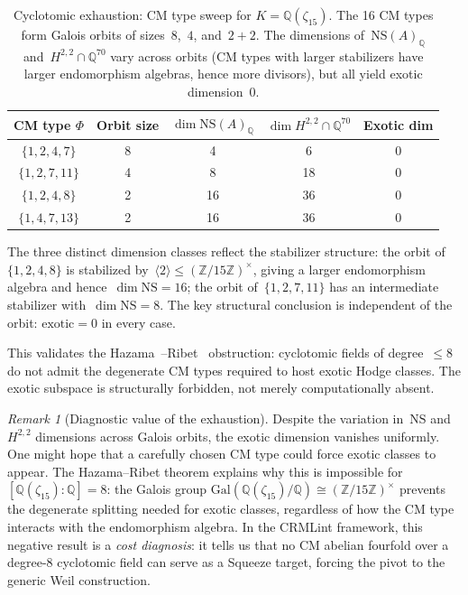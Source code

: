 \documentclass[11pt]{article}
\theoremstyle{plain}
\theoremstyle{definition}
\theoremstyle{remark}
\newtheorem{remark}[theorem]{Remark}
\newcommand{\Z}{\mathbb{Z}}
\newcommand{\Q}{\mathbb{Q}}
\newcommand{\Gal}{\mathrm{Gal}}
\newcommand{\NS}{\mathrm{NS}}
\begin{document}
\begin{table}[ht]
\centering
\caption{Cyclotomic exhaustion: CM type sweep for $K = \Q(\zeta_{15})$.
The 16 CM types form Galois orbits of sizes~$8$,~$4$, and~$2+2$.
The dimensions of~$\NS(A)_\Q$ and~$H^{2,2}\cap\Q^{70}$ vary across
orbits (CM types with larger stabilizers have larger endomorphism
algebras, hence more divisors), but all yield exotic dimension~0.}
\label{tab:cm-sweep}
\begin{tabular}{ccccc}
\toprule
\textbf{CM type $\Phi$} & \textbf{Orbit size} & $\dim \NS(A)_\Q$
& $\dim H^{2,2}\cap\Q^{70}$ & \textbf{Exotic dim} \\
\midrule
$\{1,2,4,7\}$   & 8 & 4  & 6  & 0 \\
$\{1,2,7,11\}$  & 4 & 8  & 18 & 0 \\
$\{1,2,4,8\}$   & 2 & 16 & 36 & 0 \\
$\{1,4,7,13\}$  & 2 & 16 & 36 & 0 \\
\bottomrule
\end{tabular}
\end{table}

\noindent The three distinct dimension classes reflect the stabilizer
structure: the orbit of~$\{1,2,4,8\}$ is stabilized by~$\langle 2
\rangle \leq (\Z/15\Z)^\times$, giving a larger endomorphism algebra
and hence~$\dim\NS = 16$; the orbit of~$\{1,2,7,11\}$ has an
intermediate stabilizer with~$\dim\NS = 8$.  The key structural
conclusion is independent of the orbit: $\text{exotic} = 0$ in every
case.

This validates the Hazama~\cite{hazama1984}--Ribet~\cite{ribet1983} obstruction:
cyclotomic fields of degree~$\leq 8$ do not admit the degenerate CM types
required to host exotic Hodge classes.  The exotic subspace is structurally
forbidden, not merely computationally absent.

\begin{remark}[Diagnostic value of the exhaustion]
Despite the variation in~$\NS$ and~$H^{2,2}$ dimensions across
Galois orbits, the exotic dimension vanishes uniformly.  One might hope
that a carefully chosen CM type could force exotic classes to appear.
The Hazama--Ribet theorem explains why this is impossible for
$[\Q(\zeta_{15}):\Q] = 8$: the Galois group
$\Gal(\Q(\zeta_{15})/\Q) \cong (\Z/15\Z)^\times$ prevents the
degenerate splitting needed for exotic classes, regardless of how the
CM type interacts with the endomorphism algebra.  In the CRMLint
framework, this negative result is a \emph{cost diagnosis}: it tells us
that no CM abelian fourfold over a degree-8 cyclotomic field can serve
as a Squeeze target, forcing the pivot to the generic Weil construction.
\end{remark}
\end{document}
